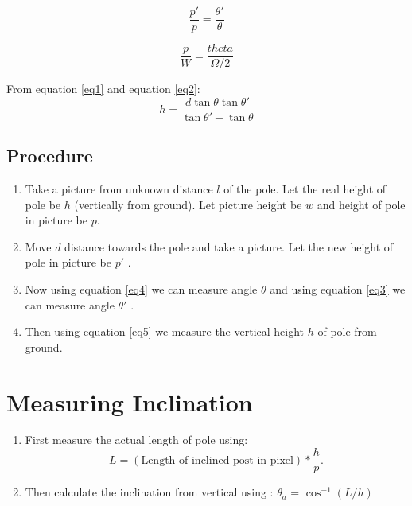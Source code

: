 \documentclass[paper=a4, fontsize=11pt]{scrartcl} %
\begin{document}
\begin{equation} \label{eq3}
  \frac{p'}{p} = \frac{\theta'}{\theta}
\end{equation}

\begin{equation} \label{eq4}
  \frac{p}{W} = \frac{theta}{\Omega/2}
\end{equation}

From equation \ref{eq1} and equation \ref{eq2}:
\begin{equation} \label{eq5}
  h = \frac{d\tan\theta\tan\theta'}{\tan\theta' - \tan\theta}
\end{equation}



\subsection{Procedure}

\begin{enumerate}
\item Take a picture from unknown distance $l$ of the pole. Let the real height of pole be $h$ (vertically from ground). Let picture height be $w$ and height of pole in picture be $p$.
\item Move $d$ distance towards the pole and take a picture. Let the new height of pole in picture be $p'$ .
\item Now using equation \ref{eq4} we can measure angle $\theta$ and using equation \ref{eq3} we can measure angle $\theta'$ .
\item Then using equation \ref{eq5} we measure the vertical height $h$ of pole from ground. 
\end{enumerate}

\section{Measuring Inclination}
\begin{enumerate}
\item First measure the actual length of pole using:\\
\begin{equation}
  L = (\text{Length of inclined post in pixel}) * \frac{h}{p}.
\end{equation}
\item Then calculate the inclination from vertical using : $\theta_a$ = $\cos^{-1}(L/h)$ 
\end{enumerate}
\end{document}

